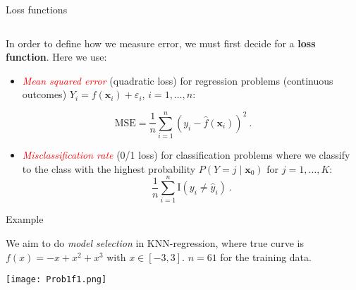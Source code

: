 \documentclass[10pt,ignorenonframetext,]{beamer}
\providecommand{\tightlist}{%
  \setlength{\itemsep}{0pt}\setlength{\parskip}{0pt}}
\begin{document}
\begin{frame}

\begin{block}{Loss functions}

\(~\)

In order to define how we measure error, we must first decide for a
\textbf{loss function}. Here we use:

\vspace{2mm}

\begin{itemize}
\tightlist
\item
  \emph{\textcolor{red}{Mean squared error}} (quadratic loss) for
  regression problems (continuous outcomes)
  \(Y_i=f({\boldsymbol x}_i)+\varepsilon_i\), \(i=1,\ldots, n\):
\end{itemize}

\[\text{MSE}=\frac{1}{n}\sum_{i=1}^n (y_i-\hat{f}({\boldsymbol x}_i))^2 \ .\]

\vspace{2mm}

\begin{itemize}
\tightlist
\item
  \emph{\textcolor{red}{Misclassification rate}} (0/1 loss) for
  classification problems where we classify to the class with the
  highest probability \(P(Y=j\mid {\boldsymbol x}_0)\) for
  \(j=1,\ldots,K\):
  \[\frac{1}{n}\sum_{i=1}^n \text{I}(y_i \neq \hat{y}_i) \ .\]
\end{itemize}

\end{block}

\end{frame}

\begin{frame}

\begin{block}{Example}

\vspace{2mm}

We aim to do \emph{model selection} in KNN-regression, where true curve
is \(f(x)=-x+x^2+x^3\) with \(x \in [-3,3]\). \(n=61\) for the training
data.

\vspace{4mm}

\centering

\texttt{[image: Prob1f1.png]}

\end{block}

\end{frame}
\end{document}
